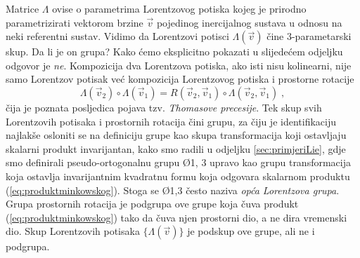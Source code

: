 Matrice $\Lambda$ ovise o parametrima Lorentzovog
potiska kojeg je prirodno parametrizirati vektorom brzine $\vec{v}$ pojedinog
inercijalnog sustava u odnosu na neki referentni sustav.
 Vidimo da Lorentzovi potisci $\Lambda(\vec{v})$ čine 3-parametarski
skup. Da li je on grupa? Kako ćemo eksplicitno pokazati u slijedećem
odjeljku odgovor je \emph{ne}. Kompozicija dva Lorentzova potiska, ako
isti nisu kolinearni, nije
samo Lorentzov potisak već kompozicija
Lorentzovog potiska i prostorne rotacije
\begin{equation}
 \Lambda(\vec{v}_2) \circ \Lambda(\vec{v}_1)
  = R(\vec{v}_2,\vec{v}_1) \circ \Lambda(\vec{v}_2,\vec{v}_1) \;,
\end{equation}
čija je  poznata posljedica pojava tzv. \emph{Thomasove precesije}. 
Tek skup svih Lorentzovih potisaka
i prostornih rotacija čini grupu, za čiju je identifikaciju najlakše
osloniti se na definiciju grupe kao skupa transformacija koji
ostavljaju skalarni produkt invarijantan, kako smo radili
u odjeljku \ref{sec:primjeriLie}, gdje smo definirali
pseudo-ortogonalnu grupu \O{1, 3} upravo kao grupu transformacija
koja ostavlja invarijantnim kvadratnu formu koja
odgovara skalarnom produktu (\ref{eq:produktminkowskog}).
Stoga se \O{1,3} često naziva \emph{opća Lorentzova grupa}.
Grupa prostornih rotacija 
je podgrupa ove grupe koja čuva produkt (\ref{eq:produktminkowskog}) tako
da čuva njen prostorni dio, a ne dira vremenski dio. Skup Lorentzovih
potisaka $\{\Lambda(\vec{v})\}$ je podskup ove grupe, ali ne i podgrupa.

